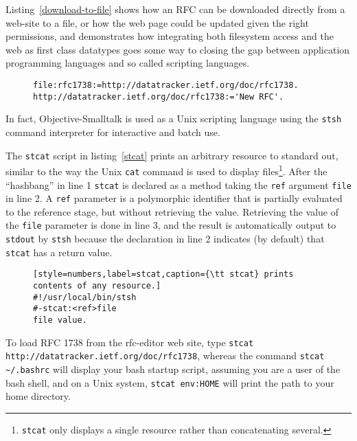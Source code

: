 \documentclass[preprint,authoryear]{acm_proc_article-sp}
\begin{document}
Listing~\ref{download-to-file} shows how an RFC can be downloaded directly from a web-site
to a file, or how the web page could be updated given the right permissions, and demonstrates how integrating both filesystem access and the web as first class datatypes
goes some way to closing the gap between application programming languages and so called
scripting languages.

\begin{figure}[htbp]
\begin{lstlisting}[style=numbers,label=download-to-file,caption=Downloading an RFC to a file.]
file:rfc1738:=http://datatracker.ietf.org/doc/rfc1738.
http://datatracker.ietf.org/doc/rfc1738:='New RFC'.
\end{lstlisting}
\end{figure}

In fact,  Objective-Smalltalk is used as a Unix scripting language using the {\tt stsh} command
interpreter for interactive and batch use.  

The {\tt stcat} script in listing~\ref{stcat} prints an arbitrary resource to standard out, 
similar to the way the Unix {\tt cat} command is used to display files\footnote{{\tt stcat} only 
displays a single resource rather than concatenating several.}.
After the ``hashbang'' in line 1 {\tt stcat} is declared as a method taking the {\tt ref} argument {\tt file} 
in line 2.
A {\tt ref} parameter is a polymorphic identifier that is partially evaluated to the reference stage,
but without retrieving the value.  Retrieving the value of the {\tt file} parameter is done in line 3,
and the result is automatically output to {\tt stdout} by {\tt stsh} because the declaration in line
2 indicates (by default) that {\tt stcat} has a return value.

\begin{figure}[htbp]
\begin{lstlisting}[style=numbers,label=stcat,caption={\tt stcat} prints contents of any resource.]
#!/usr/local/bin/stsh
#-stcat:<ref>file
file value.
\end{lstlisting}
\end{figure}

To load RFC 1738 from the rfc-editor web site, type  {\tt stcat http://datatracker.ietf.org/doc/rfc1738}, whereas 
the command {\tt stcat \~\//.bashrc} will display your bash startup script, assuming you are a user of the
bash shell, and on a Unix system, {\tt stcat env:HOME} will print the path to 
your home directory.
\end{document}
